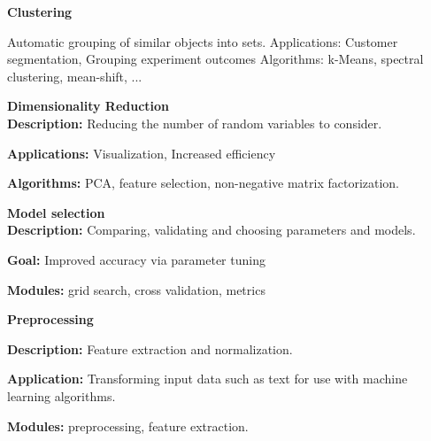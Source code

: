 \documentclass[MASTER.tex]{subfiles}
\begin{document}
 

 
 
  
\textbf{Clustering}

Automatic grouping of similar objects into sets.
Applications: Customer segmentation, Grouping experiment outcomes
Algorithms: k-Means, spectral clustering, mean-shift, ...
 
 
  
\textbf{Dimensionality Reduction}\\

 
  \textbf{Description: } Reducing the number of random variables to consider.
\item \textbf{Applications:} Visualization, Increased efficiency
\item \textbf{Algorithms:} PCA, feature selection, non-negative matrix factorization. 
 
 
 
 
\textbf{Model selection}\\
 
  \textbf{Description: } Comparing, validating and choosing parameters and models.
\item \textbf{Goal:} Improved accuracy via parameter tuning
\item \textbf{Modules:} grid search, cross validation, metrics
 
 
 
 
\textbf{Preprocessing}\\
 
\item \textbf{Description:} Feature extraction and normalization.
\item \textbf{Application:} Transforming input data such as text for use with machine learning algorithms.
\item \textbf{Modules:} preprocessing, feature extraction.
 
 
\end{document}
